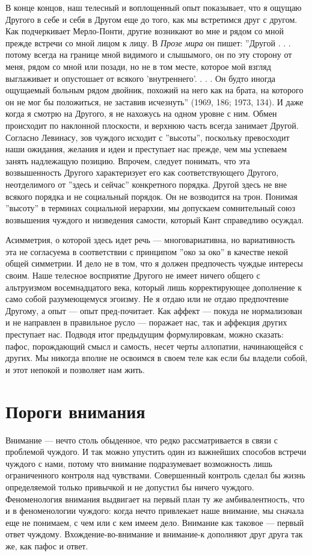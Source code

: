 \documentclass[12pt]{book}
\begin{document}
В конце концов, наш телесный и воплощенный опыт показывает, что я ощущаю Другого в себе и себя в Другом еще до того, как мы встретимся друг с другом. Как подчеркивает Мерло-Понти, другие возникают во мне и рядом со мной прежде встречи со мной лицом к лицу. В \textit{Прозе мира} он пишет: ''Другой . . . потому всегда на границе мной видимого и слышымого, он по эту сторону от меня, рядом со мной или позади, но не в том месте, которое мой взгляд выглаживает и опустошает от всякого 'внутреннего'. . . . Он будто иногда ощущаемый больным рядом двойник, похожий на него как на брата, на которого он не мог бы положиться, не заставив исчезнуть'' (1969, 186; 1973, 134). И даже когда я смотрю на Другого, я не нахожусь на одном уровне с ним. Обмен происходит по наклонной плоскости, и верхнюю часть всегда занимает Другой. Согласно Левинасу, зов чуждого исходит с ''высоты'', поскольку превосходит наши ожидания, желания и идеи и преступает нас прежде, чем мы успеваем занять надлежащую позицию. Впрочем, следует понимать, что эта возвышенность Другого характеризует его как соответствующего Другого, неотделимого от ''здесь и сейчас'' конкретного порядка. Другой здесь не вне всякого порядка и не социальный порядок. Он не возводится на трон. Понимая ''высоту'' в терминах социальной иерархии, мы допускаем сомнительный союз возвышения чуждого и низведения самости, который Кант справедливо осуждал.

Асимметрия, о которой здесь идет речь --- многовариативна, но вариативность эта не согласуема в соответствии с принципом ''око за око'' в качестве некой общей симметрии. И дело не в том, что я должен предпочесть чуждые интересы своим. Наше телесное восприятие Другого не имеет ничего общего с альтруизмом восемнадцатого века, который лишь корректирующее дополнение к само собой разумеющемуся эгоизму. Не я отдаю или не отдаю предпочтение Другому, а опыт --- опыт пред-почитает. Как аффект --- покуда не нормализован и не направлен в правильное русло --- поражает нас, так и аффекция других преступает нас. Подводя итог предыдущим формулировкам, можно сказать: пафос, порождающий смысл и самость, несет черты аллопатии, начинающейся с других. Мы никогда вполне не освоимся в своем теле как если бы владели собой, и этот непокой и позволяет нам жить.

\chapter{Пороги внимания}

Внимание --- нечто столь обыденное, что редко рассматривается в связи с проблемой чуждого. И так можно упустить один из важнейших способов встречи чуждого с нами, потому что внимание подразумевает возможность лишь ограниченного контроля над чувствами. Совершенный контроль сделал бы жизнь определяемой только привычкой и не допустил бы ничего чуждого. Феноменология внимания выдвигает на первый план ту же амбивалентность, что и в феноменологии чуждого: когда нечто привлекает наше внимание, мы сначала еще не понимаем, с чем или с кем имеем дело. Внимание как таковое --- первый ответ чуждому. Вхождение-во-внимание и внимание-к дополняют друг друга так же, как пафос и ответ.
\end{document}
